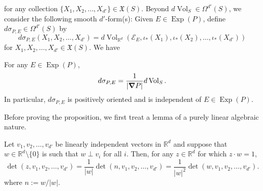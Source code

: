 \documentclass[smallextended]{svjour3}
\theoremstyle{remark}
\newcommand\Exp{\operatorname{Exp}}
\renewcommand\det{\operatorname{det}}
\newcommand{\Vol}{\operatorname{Vol}}
\begin{document}
for any collection $\{X_1,X_2,\dots,X_{d'}\}\in \mathfrak{X}(S)$. Beyond $d\Vol_S\in \Omega^{d'}(S)$, we consider the following smooth $d'$-form(s): Given $E\in \Exp(P)$, define $d\sigma_{P,E}\in\Omega^{d'}(S)$ by
\begin{equation*}
    d\sigma_{P,E}(X_1,X_2,\dots,X_{d'})=d\Vol_{\mathbb{R}^d}(\mathcal{E}_E,\iota_*(X_1),\iota_*(X_2),\dots,\iota_*(X_{d'}))
\end{equation*}
for $X_1,X_2,\dots,X_{d'}\in\mathfrak{X}(S)$. We have
\begin{proposition}\label{prop:FormRiemannRelation}
For any $E\in\Exp(P)$,
\begin{equation*}
    d\sigma_{P,E}=\frac{1}{|\grad P|}d\Vol_S.
\end{equation*}
In particular, $d\sigma_{P,E}$ is positively oriented and is independent of $E\in\Exp(P)$.
\end{proposition}
\noindent Before proving the proposition, we first treat a lemma of a purely linear algebraic nature. 
\begin{lemma}\label{lem:determinants}
Let $v_1,v_2,\dots,v_{d'}$ be linearly independent vectors in $\mathbb{R}^d$ and suppose that $w\in\mathbb{R}^d \setminus\{0\}$ is such that $w\perp v_i$ for all $i$. Then, for any $z\in\mathbb{R}^d$ for which $z\cdot w=1$,
\begin{equation*}
\det(z, v_1,v_2,\dots,v_{d'})=\frac{1}{|w|}\det(n,v_1,v_2,\dots,v_{d'})=\frac{1}{|w|^2}\det(w,v_1,v_2,\dots,v_{d'}).
\end{equation*}
where $n:=w/|w|$.
\end{lemma}
\end{document}
